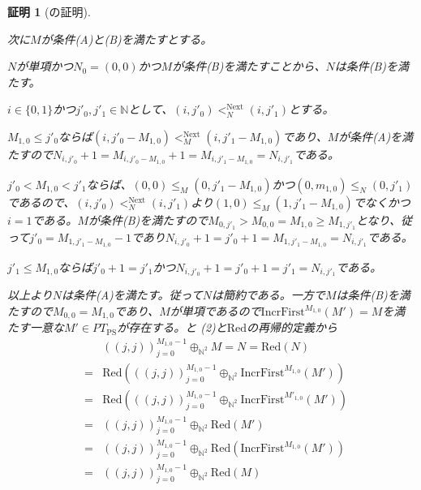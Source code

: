 \documentclass[dvipdfmx,uplatex]{jsarticle}
\theoremstyle{customnonumberbreakfortheorem}
\theoremstyle{customnonumberbreakforproof}
\newtheorem{hideableproof}{証明}
\begin{document}
\begin{hideableproof}[の証明]
\begin{indented}
\begin{indented}
			\item 次に\(M\)が条件(A)と(B)を満たすとする。
			\begin{indented}
				\item \(N\)が単項かつ\(N_0 = (0,0)\)かつ\(M\)が条件(B)を満たすことから、\(N\)は条件(B)を満たす。
				\item \(i \in \{0,1\}\)かつ\(j'_0, j'_1 \in \mathbb{N}\)として、\((i,j'_0) <_N^{\textrm{Next}} (i,j'_1)\)とする。
				\begin{indented}
					\item \(M_{1,0} \leq j'_0\)ならば\((i,j'_0-M_{1,0}) <_M^{\textrm{Next}} (i,j'_1-M_{1,0})\)であり、\(M\)が条件(A)を満たすので\(N_{i,j'_0}+1 = M_{i,j'_0-M_{1,0}}+1 = M_{i,j'_1-M_{1,0}} = N_{i,j'_1}\)である。
					\item \(j'_0 < M_{1,0} < j'_1\)ならば、\((0,0) \leq_M (0,j'_1-M_{1,0})\)かつ\((0,m_{1,0}) \leq_N (0,j'_1)\)であるので、\((i,j'_0) <_N^{\textrm{Next}} (i,j'_1)\)より\((1,0) \leq_M (1,j'_1-M_{1,0})\)でなくかつ\(i=1\)である。\(M\)が条件(B)を満たすので\(M_{0,j'_1} > M_{0,0} = M_{1,0} \geq M_{1,j'_1}\)となり、従って\(j'_0 = M_{1,j'_1-M_{1,0}}-1\)であり\(N_{i,j'_0}+1 = j'_0+1 = M_{1,j'_1-M_{1,0}} = N_{i,j'_1}\)である。
					\item \(j'_1 \leq M_{1,0}\)ならば\(j'_0+1 = j'_1\)かつ\(N_{i,j'_0}+1 = j'_0+1 = j'_1 = N_{i,j'_1}\)である。
				\end{indented}
				\item 以上より\(N\)は条件(A)を満たす。従って\(N\)は簡約である。一方で\(M\)は条件(B)を満たすので\(M_{0,0} = M_{1,0}\)であり、\(M\)が単項であるので\(\textrm{IncrFirst}^{M_{1,0}}(M') = M\)を満たす一意な\(M' \in PT_{\textrm{PS}}\)が存在する。と (2)と\(\textrm{Red}\)の再帰的定義から
				\begin{eqnarray*}
				& & ((j,j))_{j=0}^{M_{1,0}-1} \oplus_{\mathbb{N}^2} M = N = \textrm{Red}(N) \\
				& = & \textrm{Red}(((j,j))_{j=0}^{M_{1,0}-1} \oplus_{\mathbb{N}^2} \textrm{IncrFirst}^{M_{1,0}}(M')) \\
				& = & \textrm{Red}(((j,j))_{j=0}^{M_{1,0}-1} \oplus_{\mathbb{N}^2} \textrm{IncrFirst}^{M'_{1,0}}(M')) \\
				& = & ((j,j))_{j=0}^{M_{1,0}-1} \oplus_{\mathbb{N}^2} \textrm{Red}(M') \\
				& = & ((j,j))_{j=0}^{M_{1,0}-1} \oplus_{\mathbb{N}^2} \textrm{Red}(\textrm{IncrFirst}^{M_{1,0}}(M')) \\
				& = & ((j,j))_{j=0}^{M_{1,0}-1} \oplus_{\mathbb{N}^2} \textrm{Red}(M)

\end{eqnarray*}
\end{indented}
\end{indented}
\end{indented}
\end{hideableproof}
\end{document}
